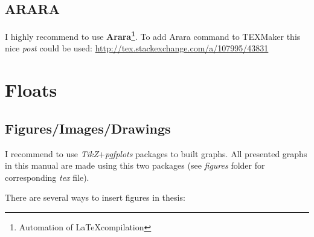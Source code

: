 \subsection{ARARA}
I highly recommend to use \textbf{Arara\footnote{Automation of \LaTeX compilation}}. To add Arara command to TEXMaker this nice \textit{post} could be used: \href{http://tex.stackexchange.com/a/107995/43831}{http://tex.stackexchange.com/a/107995/43831}


\section{Floats}

\subsection{Figures/Images/Drawings}
I recommend to use \textit{TikZ}+\textit{pgfplots} packages to built graphs. All presented graphs in this manual are made using this two packages (see \textit{figures} folder for corresponding \textit{tex} file).\par

There are several ways to insert figures in thesis:

